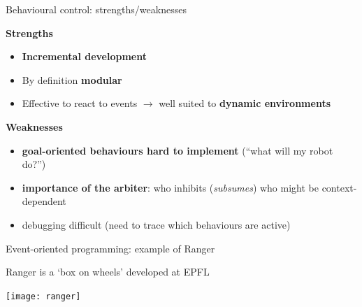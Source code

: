 \documentclass[compress]{beamer}
\begin{document}
\begin{frame}{Behavioural control: strengths/weaknesses}

    {\bf Strengths}

    \begin{itemize}
        \item {\bf Incremental development}
        \item By definition {\bf modular}
        \item Effective to react to events $\rightarrow$ well suited to {\bf
            dynamic environments}
    \end{itemize}

    {\bf Weaknesses}

    \begin{itemize}
        \item {\bf goal-oriented behaviours hard to implement} (``what will my robot do?'')
        \item {\bf importance of the arbiter}: who inhibits (\ie \emph{subsumes}) who might be context-dependent
        \item debugging difficult (need to trace which behaviours are active)
    \end{itemize}


\end{frame}

\begin{frame}{Event-oriented programming: example of Ranger}

    Ranger is a `box on wheels' developed at EPFL

    \begin{center}
        \texttt{[image: ranger]}
    \end{center}
\end{frame}

\end{document}
